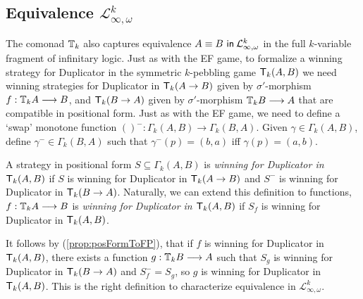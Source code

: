 \subsection{Equivalence $\mathcal{L}^{k}_{\infty,\omega}$}
The comonad ${\mathbb{T}_{k}}$ also captures equivalence ${A \equiv B \ \mathsf{in}\: \mathcal{L}^{k}_{\infty,\omega}}$ in the full $k$-variable fragment of infinitary logic. Just as with the EF game, to formalize a winning strategy for Duplicator in the symmetric $k$-pebbling game ${\mathsf{T}_{k}(A,B)}$ we need winning strategies for Duplicator in ${\mathsf{T}_{k}(A \rightarrow B)}$ given by $\sigma'$-morphism $f:{\mathbb{T}_{k}A} \longrightarrow B$, and ${\mathsf{T}_{k}(B \rightarrow A)}$ given by $\sigma'$-morphism ${\mathbb{T}_{k}B} \longrightarrow A$ that are compatible in positional form. Just as with the EF game, we need to define a `swap' monotone function $()^{-}:\Gamma_{k}(A,B) \longrightarrow \Gamma_{k}(B,A)$. Given $\gamma \in \Gamma_{k}(A,B)$, define $\gamma^{-} \in \Gamma_{k}(B,A)$ such that $\gamma^{-}(p) = (b,a)$ iff $\gamma(p) = (a,b)$. 
\begin{defn}
A strategy in positional form $S \subseteq \Gamma_{k}(A,B)$ is \textit{winning for Duplicator in ${\mathsf{T}_{k}(A,B)}$} if $S$ is winning for Duplicator in ${\mathsf{T}_{k}(A \rightarrow B)}$ and $S^{-}$ is winning for Duplicator in ${\mathsf{T}_{k}(B \rightarrow A)}$. Naturally, we can extend this definition to functions, $f:{\mathbb{T}_{k}A} \longrightarrow B$ is \textit{winning for Duplicator in ${\mathsf{T}_{k}(A,B)}$} if $S_{f}$ is winning for Duplicator in ${\mathsf{T}_{k}(A,B)}$.
\end{defn}
It follows by (\ref{prop:posFormToFP}), that if $f$ is winning for Duplicator in ${\mathsf{T}_{k}(A,B)}$, there exists a function $g:{\mathbb{T}_{k}B} \longrightarrow A$ such that $S_{g}$ is winning for Duplicator in ${\mathsf{T}_{k}(B \rightarrow A)}$ and $S_{f}^{-} = S_{g}$, so $g$ is winning for Duplicator in ${\mathsf{T}_{k}(A,B)}$. This is the right definition to characterize equivalence in $\mathcal{L}^{k}_{\infty,\omega}$. 
